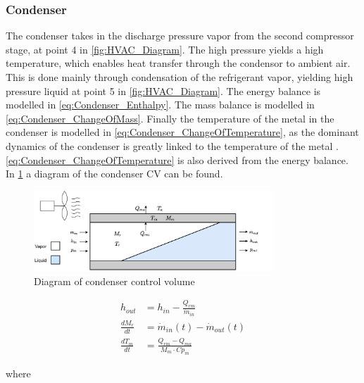 \subsubsection{Condenser}

The condenser takes in the discharge pressure vapor from the second compressor stage, at point 4 in \cref{fig:HVAC_Diagram}. The high pressure yields a high temperature,
which enables heat transfer through the condensor to ambient air. This is done mainly through condensation of the refrigerant vapor, yielding high pressure liquid at point 5 in \cref{fig:HVAC_Diagram}.
The energy balance is modelled in \cref{eq:Condenser_Enthalpy}. The mass balance is modelled in \cref{eq:Condenser_ChangeOfMass}. Finally the temperature of the metal in the condenser is modelled in
\cref{eq:Condenser_ChangeOfTemperature}, as the dominant dynamics of the condenser is greatly linked to the temperature of the metal \cite{Sorensen2013}. \cref{eq:Condenser_ChangeOfTemperature} is also
derived from the energy balance. In \cref{fig:condenser_CV} a diagram of the condenser CV can be found.

\begin{figure}[h!]
	\centering
	\includegraphics[width=0.8\textwidth]{Graphics/Condenser.pdf}
	\caption{Diagram of condenser control volume}
	\label{fig:condenser_CV}
\end{figure}

\begin{align}
	h_{out} 			& = h_{in} - \frac{Q_{rm}}{\dot{m}_{in}}  	\label{eq:Condenser_Enthalpy} \\
	\frac{dM_r}{dt} 	& = \dot{m}_{in}(t) - \dot{m}_{out}(t) 				\label{eq:Condenser_ChangeOfMass}\\
	\frac{dT_m}{dt} 	& = \frac{Q_{rm} - Q_{ma}}{M_m \cdot Cp_m}		\label{eq:Condenser_ChangeOfTemperature}
\end{align}

where

